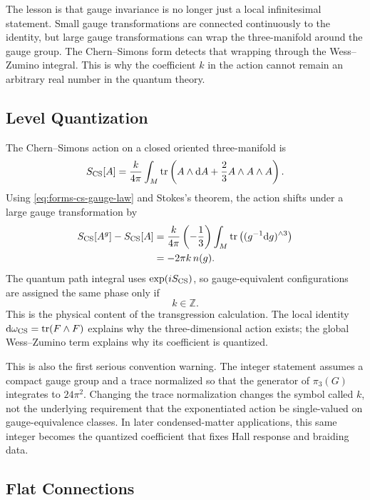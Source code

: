 The lesson is that gauge invariance is no longer just a local infinitesimal statement. Small gauge transformations are connected continuously to the identity, but large gauge transformations can wrap the three-manifold around the gauge group. The Chern--Simons form detects that wrapping through the Wess--Zumino integral. This is why the coefficient $k$ in the action cannot remain an arbitrary real number in the quantum theory.

\subsection{Level Quantization}
\label{subsec:level-quantization-forms}

The Chern--Simons action on a closed oriented three-manifold is
\begin{equation}
  S_{\operatorname{CS}}[A]
  =
  \frac{k}{4\pi}\int_M
  \operatorname{tr}\left(A\wedge\mathrm{d} A+\frac23 A\wedge A\wedge A\right).
  \label{eq:forms-cs-action}
\end{equation}
Using \eqref{eq:forms-cs-gauge-law} and Stokes's theorem, the action shifts under a large gauge transformation by
\begin{align}
  S_{\operatorname{CS}}[A^g]-S_{\operatorname{CS}}[A]
  &=
  \frac{k}{4\pi}
  \left(-\frac13\right)
  \int_M \operatorname{tr}\left((g^{-1}\mathrm{d} g)^{\wedge 3}\right)
  \notag\\
  &=
  -2\pi k\,n(g).
  \label{eq:forms-action-shift}
\end{align}
The quantum path integral uses $\exp(iS_{\operatorname{CS}})$, so gauge-equivalent configurations are assigned the same phase only if
\begin{equation}
  k\in\mathbb Z.
  \label{eq:forms-level-integer}
\end{equation}
This is the physical content of the transgression calculation. The local identity $\mathrm{d}\omega_{\operatorname{CS}}=\operatorname{tr}(F\wedge F)$ explains why the three-dimensional action exists; the global Wess--Zumino term explains why its coefficient is quantized.

This is also the first serious convention warning. The integer statement assumes a compact gauge group and a trace normalized so that the generator of $\pi_3(G)$ integrates to $24\pi^2$. Changing the trace normalization changes the symbol called $k$, not the underlying requirement that the exponentiated action be single-valued on gauge-equivalence classes. In later condensed-matter applications, this same integer becomes the quantized coefficient that fixes Hall response and braiding data.

\subsection{Flat Connections}
\label{subsec:flat-connection-eom}

